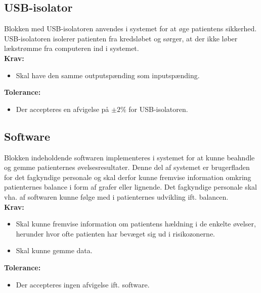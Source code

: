 \subsection{USB-isolator}\label{kravspecifikationer_USB}
Blokken med USB-isolatoren anvendes i systemet for at øge patientens sikkerhed. USB-isolatoren isolerer patienten fra kredsløbet og sørger, at der ikke løber lækstrømme fra computeren ind i systemet.\\
\textbf{Krav:}
\begin{itemize}
	\item Skal have den samme outputspænding som inputspænding. 
\end{itemize}
\textbf{Tolerance:}
\begin{itemize}
	\item Der accepteres en afvigelse på $\pm2\%$ for USB-isolatoren. 
\end{itemize}
\subsection{Software}\label{subsec:software}
Blokken indeholdende softwaren implementeres i systemet for at kunne beahndle og gemme patienternes øvelsesresultater. Denne del af systemet er brugerfladen for det fagkyndige personale og skal derfor kunne fremvise information omkring patienternes balance i form af grafer eller lignende. Det fagkyndige personale skal vha. af softwaren kunne følge med i patienternes udvikling ift. balancen. \\
\textbf{Krav:}
\begin{itemize}
	\item Skal kunne fremvise information om patientens hældning i de enkelte øvelser, herunder hvor ofte patienten har bevæget sig ud i risikozonerne. 
	\item Skal kunne gemme data.
\end{itemize}
\textbf{Tolerance:}
\begin{itemize}
	\item Der accepteres ingen afvigelse ift. software. 
\end{itemize}